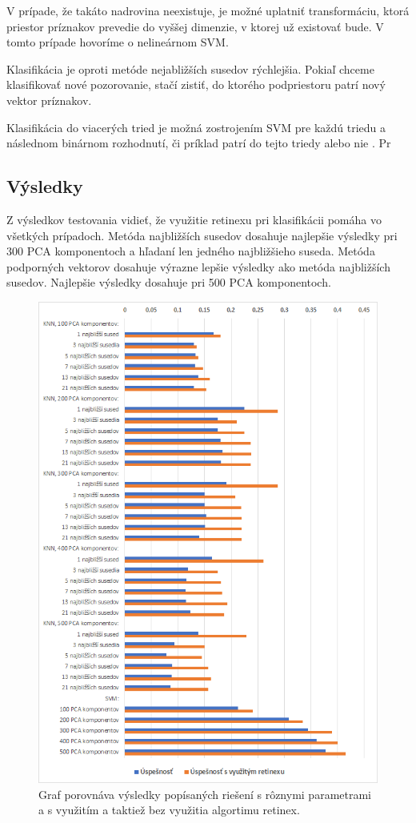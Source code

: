 V prípade, že takáto nadrovina neexistuje, je možné uplatniť transformáciu, ktorá priestor príznakov prevedie do vyššej dimenzie, v ktorej už existovať bude.
V tomto prípade hovoríme o nelineárnom SVM.

Klasifikácia je oproti metóde nejabližších susedov rýchlejšia.
Pokiaľ chceme klasifikovať nové pozorovanie, stačí zistiť, do ktorého podpriestoru patrí nový vektor príznakov.

Klasifikácia do viacerých tried je možná zostrojením SVM pre každú triedu a následnom binárnom rozhodnutí, či príklad patrí do tejto triedy alebo nie \cite{svm}. 
Pr

\subsection{Výsledky}
Z výsledkov testovania vidieť, že využitie retinexu pri klasifikácii pomáha vo všetkých prípadoch.
Metóda najbližších susedov dosahuje najlepšie výsledky pri 300 PCA komponentoch a hľadaní len jedného najbližšieho suseda.
Metóda podporných vektorov dosahuje výrazne lepšie výsledky ako metóda najbližších susedov.
Najlepšie výsledky dosahuje pri 500 PCA komponentoch.

\begin{figure}[H]
\centerline{\includegraphics[width=1\textwidth]{images/graph_features_compare}}
\caption[Výsledky porovnania metód]{Graf porovnáva výsledky popísaných riešení s rôznymi parametrami a s využitím a taktiež bez využitia algortimu retinex.}
\label{obr:graph_features_compare.png}
\end{figure}

